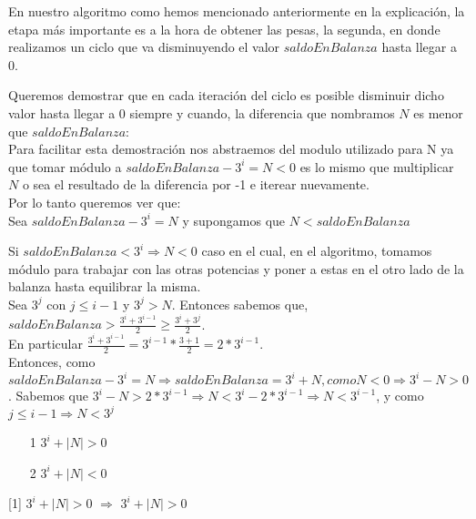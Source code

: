 
En nuestro algoritmo como hemos mencionado anteriormente en la explicaci\'on, la etapa m\'as importante es a la hora de obtener las pesas, la segunda, en donde realizamos un ciclo que va disminuyendo el valor $saldoEnBalanza$ hasta llegar a 0. 

Queremos demostrar que en cada iteraci\'on del ciclo es posible disminuir dicho valor hasta llegar a 0 siempre y cuando, la diferencia que nombramos $N$ es menor que $saldoEnBalanza$:\\

Para facilitar esta demostraci\'on nos abstraemos del modulo utilizado para N ya que tomar m\'odulo a $saldoEnBalanza - {3^i} = N < 0$ es lo mismo que multiplicar $N$ o sea el resultado de la diferencia por -1 e iterear nuevamente.\\ 

Por lo tanto queremos ver que:\\

Sea $saldoEnBalanza - {3^i} = N$ y supongamos que $N < saldoEnBalanza$

Si $saldoEnBalanza < {3^i} \Rightarrow N < 0$ caso en el cual, en el algoritmo, tomamos m\'odulo para trabajar con las otras potencias y poner a estas en el otro lado de la balanza hasta equilibrar la misma.\\

Sea ${3^j}$ con $j \leq i-1$ y ${3^j} > N$. Entonces sabemos que, $saldoEnBalanza > \frac{{3^i}+ {3^{i-1}}}{2} \geq \frac{{3^i}+ {3^{j}}}{2}$.\\

En particular $\frac{{3^i}+ {3^{i-1}}}{2} = {3^{i-1}}\ast\frac{3+1}{2} = 2\ast{3^{i-1}}$.\\

Entonces, como  $saldoEnBalanza - {3^i} = N \Rightarrow saldoEnBalanza = {3^i} + N, como N < 0 \Rightarrow {3^i} - N > 0$. Sabemos que ${3^i} - N > 2\ast{3^{i-1}} \Rightarrow N < {3^i} -2\ast{3^{i-1}} \Rightarrow N < {3^{i-1}}$, y como $j \leq i-1 \Rightarrow N < {3^{j}}$





\begin{enumerate}
\item[1]  ${3^i} + |N| > 0$ 
\item[2]  ${3^i} + |N| < 0$
\end{enumerate}

[1]  ${3^i} + |N| > 0$  $\Rightarrow$  ${3^i} + |N| > 0$